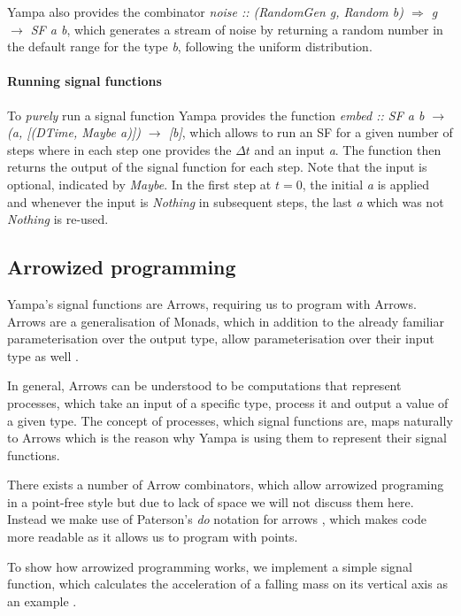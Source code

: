 Yampa also provides the combinator \textit{noise :: (RandomGen g, Random b) $\Rightarrow$ g $\rightarrow$ SF a b}, which generates a stream of noise by returning a random number in the default range for the type \textit{b}, following the uniform distribution.

\paragraph{Running signal functions}
To \textit{purely} run a signal function Yampa provides the function \textit{embed :: SF a b $\rightarrow$ (a, [(DTime, Maybe a)]) $\rightarrow$ [b]}, which allows to run an SF for a given number of steps where in each step one provides the $\Delta t$ and an input \textit{a}. The function then returns the output of the signal function for each step. Note that the input is optional, indicated by \textit{Maybe}. In the first step at $t = 0$, the initial \textit{a} is applied and whenever the input is \textit{Nothing} in subsequent steps, the last \textit{a} which was not \textit{Nothing} is re-used.

\subsection{Arrowized programming}
Yampa's signal functions are Arrows, requiring us to program with Arrows. Arrows are a generalisation of Monads, which in addition to the already familiar parameterisation over the output type, allow parameterisation over their input type as well \cite{hughes_generalising_2000, hughes_programming_2005}.

In general, Arrows can be understood to be computations that represent processes, which take an input of a specific type, process it and output a value of a given type. The concept of processes, which signal functions are, maps naturally to Arrows which is the reason why Yampa is using them to represent their signal functions.

There exists a number of Arrow combinators, which allow arrowized programing in a point-free style but due to lack of space we will not discuss them here. Instead we make use of Paterson's \textit{do} notation for arrows \cite{paterson_new_2001}, which makes code more readable as it allows us to program with points.

To show how arrowized programming works, we implement a simple signal function, which calculates the acceleration of a falling mass on its vertical axis as an example \cite{perez_testing_2017}.

